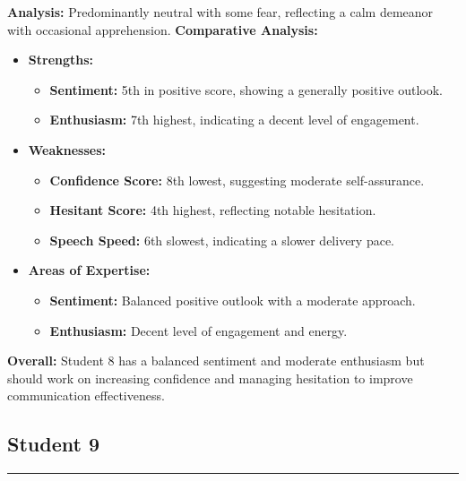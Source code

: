 \documentclass{article}
\begin{document}
    \textbf{Analysis:} Predominantly neutral with some fear, reflecting a calm demeanor with occasional apprehension.
    \vspace{0.2in}
\textbf{Comparative Analysis:}
\begin{itemize}
    \item \textbf{Strengths:}
    \begin{itemize}
        \item \textbf{Sentiment:} 5th in positive score, showing a generally positive outlook.
        \item \textbf{Enthusiasm:} 7th highest, indicating a decent level of engagement.
    \end{itemize}
    \item \textbf{Weaknesses:}
    \begin{itemize}
        \item \textbf{Confidence Score:} 8th lowest, suggesting moderate self-assurance.
        \item \textbf{Hesitant Score:} 4th highest, reflecting notable hesitation.
        \item \textbf{Speech Speed:} 6th slowest, indicating a slower delivery pace.
    \end{itemize}
    \item \textbf{Areas of Expertise:}
    \begin{itemize}
        \item \textbf{Sentiment:} Balanced positive outlook with a moderate approach.
        \item \textbf{Enthusiasm:} Decent level of engagement and energy.
    \end{itemize}
\end{itemize}

\textbf{Overall:} Student 8 has a balanced sentiment and moderate enthusiasm but should work on increasing confidence and managing hesitation to improve communication effectiveness.


\vspace{0.3in}
\subsection{Student 9}
\begin{center}
    \color{green}\rule{1\linewidth}{0.7mm}
\end{center}
\end{document}
